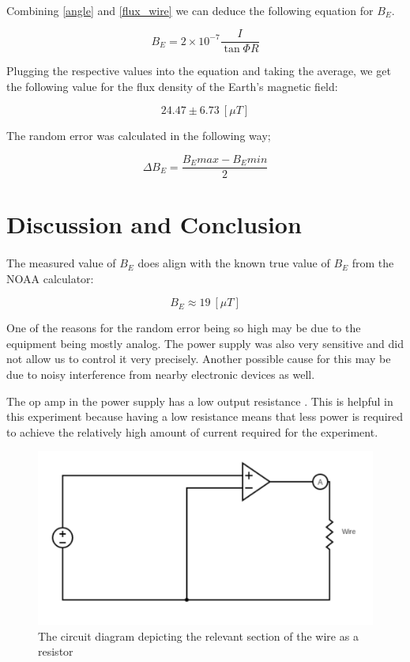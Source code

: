 \documentclass{article}
\begin{document}
\paragraph{}

Combining \eqref{angle} and \eqref{flux_wire} we can deduce the following equation for \(B_E\).

\begin{equation}\label{flux_earth}
  B_E = 2\times10^{-7} \frac{I}{\tan{\Phi}R}
\end{equation}

Plugging the respective values into the equation and taking the average, we get the following value for the flux density of the Earth's magnetic field:

\[
  24.47 \pm 6.73 ~[\mu T]
\]

The random error was calculated in the following way;

\[ \Delta B_E = \frac{B_Emax - B_Emin}{2}\]

\section{Discussion and Conclusion}
\paragraph{}
The measured value of \(B_E\) does align with the known true value of \(B_E\) from the NOAA calculator:

\[ B_E \approx 19 ~[\mu T]\]

One of the reasons for the random error being so high may be due to the equipment being mostly analog. The power supply was also very sensitive and did not allow us to control it very precisely. Another possible cause for this may be due to noisy interference from nearby electronic devices as well.

The op amp in the power supply has a low output resistance \autocite{UPCSE2018}. This is helpful in this experiment because having a low resistance means that less power is required to achieve the relatively high amount of current required for the experiment.
\begin{figure}[H]
  \includegraphics[width=\linewidth]{img/circuit.pdf}
  \caption{The circuit diagram depicting the relevant section of the wire as a resistor}
  \label{fig:circ}
\end{figure}

\printbibliography
\end{document}
